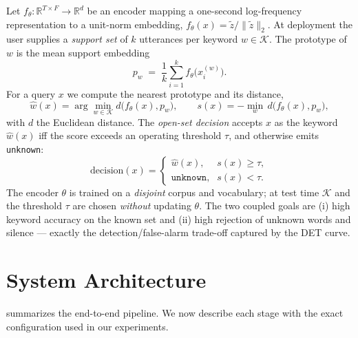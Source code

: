 \documentclass[10pt,twocolumn]{article}
\newcommand{\R}{\mathbb{R}}
\newcommand{\norm}[1]{\lVert #1\rVert}
\begin{document}
Let $f_\theta:\R^{T\times F}\!\to\!\R^{d}$ be an encoder mapping a one-second
log-frequency representation to a unit-norm embedding,
$f_\theta(x)=\tilde z/\norm{\tilde z}_2$. At deployment the user supplies a
\emph{support set} of $k$ utterances per keyword $w\in\mathcal{K}$. The prototype
of $w$ is the mean support embedding
\begin{equation}
p_w \;=\; \frac{1}{k}\sum_{i=1}^{k} f_\theta\!\big(x^{(w)}_i\big).
\label{eq:proto}
\end{equation}
For a query $x$ we compute the nearest prototype and its distance,
\begin{equation}
\hat w(x)=\arg\min_{w\in\mathcal{K}} d\!\big(f_\theta(x),p_w\big),\qquad
s(x)=-\!\min_{w}\, d\!\big(f_\theta(x),p_w\big),
\label{eq:score}
\end{equation}
with $d$ the Euclidean distance. The \emph{open-set decision} accepts $x$ as the
keyword $\hat w(x)$ iff the score exceeds an operating threshold $\tau$, and
otherwise emits \texttt{unknown}:
\begin{equation}
\text{decision}(x)=
\begin{cases}
\hat w(x), & s(x)\ge \tau,\\[2pt]
\texttt{unknown}, & s(x)<\tau .
\end{cases}
\label{eq:decision}
\end{equation}
The encoder $\theta$ is trained on a \emph{disjoint} corpus and vocabulary; at
test time $\mathcal{K}$ and the threshold $\tau$ are chosen \emph{without}
updating $\theta$. The two coupled goals are (i) high keyword accuracy on the
known set and (ii) high rejection of unknown words and silence --- exactly the
detection/false-alarm trade-off captured by the DET curve.

\section{System Architecture}\label{sec:system}

 summarizes the end-to-end pipeline. We now describe each
stage with the exact configuration used in our experiments.
\end{document}
